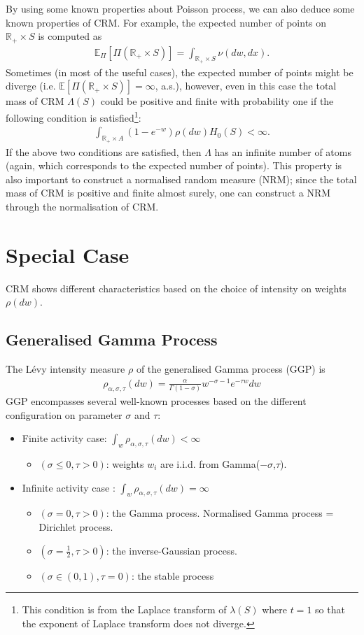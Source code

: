 \documentclass{article}
\begin{document}
By using some known properties about Poisson process, we can also deduce some known properties of CRM. For example, the expected number of points on $\mathbb{R}_+ \times S$ is computed as
\begin{align}
\mathbb{E}_\Pi[\Pi(\mathbb{R}_+ \times S)] = \int_{\mathbb{R}_+ \times S} \nu(dw,dx).
\end{align}
Sometimes (in most of the useful cases), the expected number of points might be diverge (i.e. $\mathbb{E}[\Pi(\mathbb{R}_+ \times S)] = \infty$, a.s.), however, even in this case the total mass of CRM $\Lambda(S)$ could be positive and finite with probability one if the following condition is satisfied\footnote{This condition is from the Laplace transform of $\lambda(S)$ where $t=1$ so that the exponent of Laplace transform does not diverge.}:
\begin{align}
\int_{\mathbb{R}_+ \times A} (1- e^{-w}) \rho(dw)H_0(S) < \infty.
\end{align}
If the above two conditions are satisfied, then $\Lambda$ has an infinite number of atoms (again, which corresponds to the expected number of points). This property is also important to construct a normalised random measure (NRM); since the total mass of CRM is positive and finite almost surely, one can construct a NRM through the normalisation of CRM.

\section{Special Case}
CRM shows different characteristics based on the choice of intensity on weights $\rho(dw)$. 

\subsection{Generalised Gamma Process}
The L\'{e}vy intensity measure $\rho$ of the generalised Gamma process (GGP) is
\begin{align}
\rho_{\alpha, \sigma, \tau}(dw) = \frac{\alpha}{\Gamma(1-\sigma)}w^{-\sigma - 1}e^{-\tau w} dw
\end{align}
GGP encompasses several well-known processes based on the different configuration on parameter $\sigma$ and $\tau$: 
\begin{itemize}
\item Finite activity case: $\int_w \rho_{\alpha, \sigma, \tau}(dw) < \infty$
\begin{itemize}
\item $(\sigma \le 0, \tau > 0)$: weights $w_i$ are i.i.d. from Gamma($-\sigma$,$\tau$).
\end{itemize}
\item Infinite activity case : $\int_w \rho_{\alpha, \sigma, \tau}(dw) = \infty$
\begin{itemize}
\item $(\sigma = 0, \tau > 0)$: the Gamma process. Normalised Gamma process = Dirichlet process.
\item $(\sigma = \frac{1}{2}, \tau > 0)$: the inverse-Gaussian process.
\item $(\sigma \in (0, 1), \tau = 0)$: the stable process 
\end{itemize}
\end{itemize}
\end{document}
